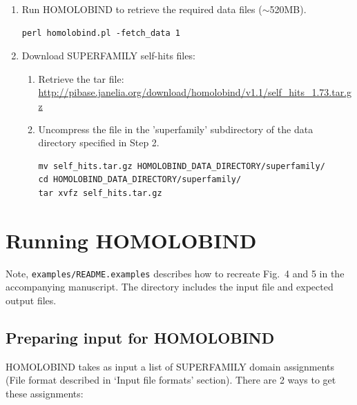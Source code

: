 \documentclass[11pt]{article}
\begin{document}
\begin{enumerate}
\begin{itemize}
\end{itemize}

\item Run HOMOLOBIND to retrieve the required data files ($\sim$520MB).

\lstset{breaklines=true,language=bash,breakatwhitespace=true}
\lstset{frame=single}
\lstset{basicstyle=\ttfamily}
\begin{lstlisting}
perl homolobind.pl -fetch_data 1
\end{lstlisting}

\item Download SUPERFAMILY self-hits files:

\begin{enumerate}

%
\item Retrieve the tar file:\\\url{http://pibase.janelia.org/download/homolobind/v1.1/self_hits_1.73.tar.gz}
%

\item Uncompress the file in the 'superfamily' subdirectory of the data directory specified in Step 2.

\lstset{breaklines=true,language=bash,breakatwhitespace=true}
\lstset{frame=single}
\lstset{basicstyle=\ttfamily}
\begin{lstlisting}
mv self_hits.tar.gz HOMOLOBIND_DATA_DIRECTORY/superfamily/
cd HOMOLOBIND_DATA_DIRECTORY/superfamily/
tar xvfz self_hits.tar.gz
\end{lstlisting}
\end{enumerate}

\end{enumerate}

\section{Running HOMOLOBIND}
Note, {\tt examples/README.examples} describes how to recreate Fig.\ 4 and 5 in the accompanying manuscript. The directory includes the input file and expected output files.

\subsection{Preparing input for HOMOLOBIND}
HOMOLOBIND takes as input a list of SUPERFAMILY domain assignments (File format described in `Input file formats' section). There are 2 ways to get these assignments:
\end{document}
